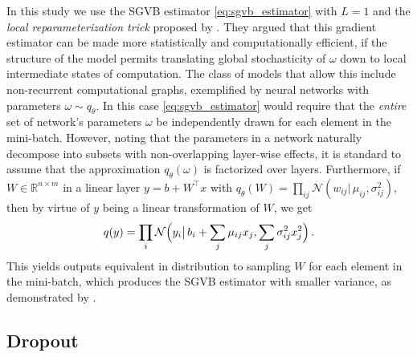 \documentclass[a4paper,10pt,twocolumn]{article}
\begin{document}
In this study we use the SGVB estimator \eqref{eq:sgvb_estimator} with $L=1$ and the
\emph{local reparameterization trick} proposed by \citet{kingma_variational_2015}. They
argued that this gradient estimator can be made more statistically and computationally
efficient, if the structure of the model permits translating global stochasticity of
$\omega$ down to local intermediate states of computation.
%
The class of models that allow this include non-recurrent computational graphs,
exemplified by neural networks with parameters $\omega \sim q_\theta$. In this case
\eqref{eq:sgvb_estimator} would require that the \emph{entire} set of network's parameters
$\omega$ be independently drawn for each element in the mini-batch. However, noting
that the parameters in a network naturally decompose into subsets with non-overlapping
layer-wise effects, it is standard to assume that the approximation $
  q_\theta(\omega)
$ is factorized over layers. Furthermore, if $
  W \in \mathbb{R}^{n\times m}
$ in a linear layer $
  y = b + W^\top x
$ with $
  q_\theta(W)
    = \prod_{ij}
      \mathcal{N}(w_{ij} \vert\, \mu_{ij}, \sigma_{ij}^2)
$, then by virtue of $y$ being a linear transformation of $W$, we get
\begin{equation}  \label{eq:r-gauss-trick}
  q(y) = \prod_i \mathcal{N}\Bigl(
        y_i \big\vert\,
        b_i + \sum_j \mu_{ij} x_j,
        \sum_j \sigma^2_{ij} x_j^2
    \Bigr)
  \,.
\end{equation}
This yields outputs equivalent in distribution to sampling $W$ for each element in
the mini-batch, which produces the SGVB estimator with smaller variance, as demonstrated
by \citet{kingma_variational_2015}.


\subsection{Dropout} %
\label{sub:dropout}
\end{document}
